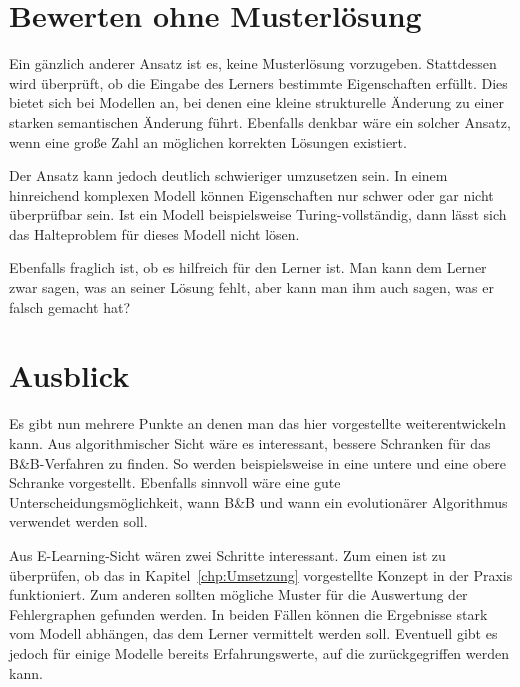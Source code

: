 \section{Bewerten ohne Musterlösung}
Ein gänzlich anderer Ansatz ist es, keine Musterlösung vorzugeben. 
Stattdessen wird überprüft, ob die Eingabe des Lerners bestimmte 
Eigenschaften erfüllt. Dies bietet sich bei Modellen an, bei denen eine 
kleine strukturelle Änderung zu einer starken semantischen Änderung führt. 
Ebenfalls denkbar wäre ein solcher Ansatz, wenn eine große Zahl an 
möglichen korrekten Lösungen existiert.

Der Ansatz kann jedoch deutlich schwieriger umzusetzen sein. In einem 
hinreichend komplexen Modell können Eigenschaften nur schwer oder gar 
nicht überprüfbar sein. Ist ein Modell beispielsweise Turing-vollständig, 
dann lässt sich das Halteproblem für dieses Modell nicht lösen.

Ebenfalls fraglich ist, ob es hilfreich für den Lerner ist. Man kann dem 
Lerner zwar sagen, was an seiner Lösung fehlt, aber kann man ihm auch sagen, 
was er falsch gemacht hat?

\section{Ausblick}
Es gibt nun mehrere Punkte an denen man das hier vorgestellte weiterentwickeln kann. 
Aus algorithmischer Sicht wäre es interessant, bessere Schranken für das B\&B-Verfahren 
zu finden. So werden beispielsweise in \cite{ApproxGED} eine untere und eine obere Schranke 
vorgestellt. Ebenfalls sinnvoll wäre eine gute Unterscheidungsmöglichkeit, wann B\&B und wann 
ein evolutionärer Algorithmus verwendet werden soll.

Aus E-Learning-Sicht wären zwei Schritte interessant. Zum einen ist zu überprüfen, ob das in 
Kapitel~\ref{chp:Umsetzung} vorgestellte Konzept in der Praxis funktioniert. Zum anderen sollten 
mögliche Muster für die Auswertung der Fehlergraphen gefunden werden. In beiden Fällen können 
die Ergebnisse stark vom Modell abhängen, das dem Lerner vermittelt werden soll. Eventuell gibt 
es jedoch für einige Modelle bereits Erfahrungswerte, auf die zurückgegriffen werden kann.
